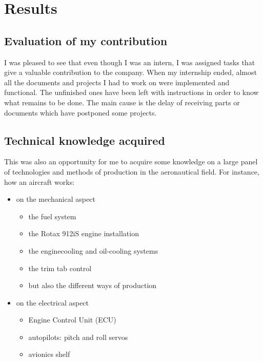 \documentclass[11pt,a4paper]{article}
\begin{document}

\newpage

\section{Results}
\subsection{Evaluation of my contribution}
 I was pleased to see that even though I was an intern, I was assigned tasks that give a valuable contribution to the company. When my internship ended, almost all the documents and projects I had to work on were implemented and functional. The unfinished ones have been left with instructions in order to know what remains to be done. The main cause is the delay of receiving parts or documents which have postponed some projects.

\subsection{Technical knowledge acquired}
This was also an opportunity for me to acquire some knowledge on a large panel of technologies and methods of production in the aeronautical field. For instance, how an aircraft works:
\begin{itemize}
\setlength{\itemsep}{0pt}
\item on the mechanical aspect
\begin{itemize}
\setlength{\itemsep}{0pt}
\item the fuel system
\item the Rotax 912iS engine installation
\item the enginecooling and oil-cooling systems
\item the trim tab control
\item but also the different ways of production
\end{itemize}
\item on the electrical aspect
\begin{itemize}
\setlength{\itemsep}{0pt}
\item Engine Control Unit (ECU)
\item autopilots: pitch and roll servos
\item avionics shelf
\end{itemize}
\end{itemize}
\end{document}
